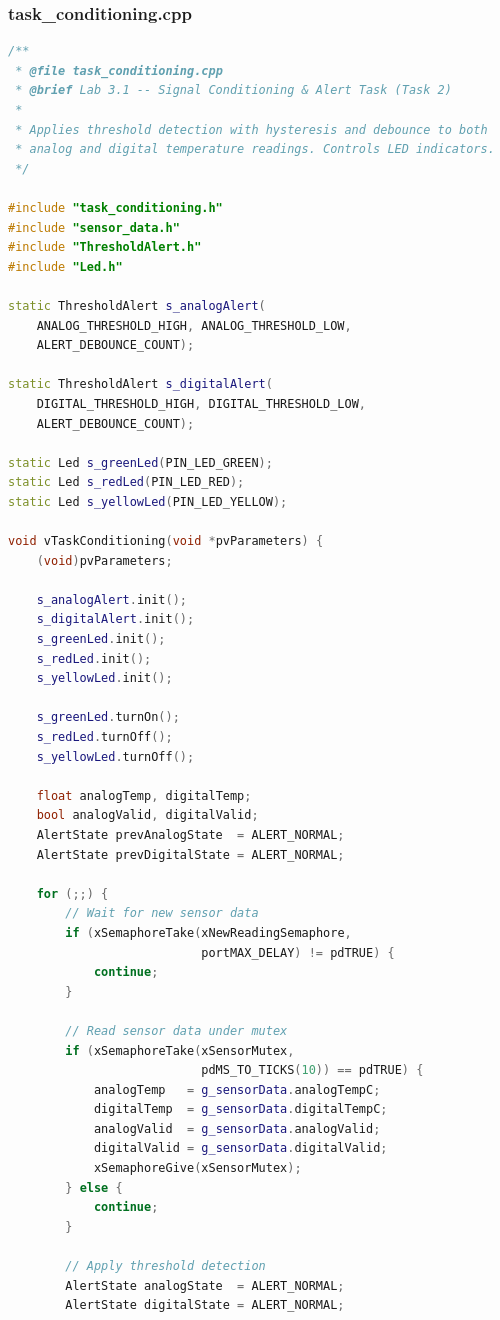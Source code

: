 \subsubsection{task\_conditioning.cpp}
\begin{lstlisting}[language=C++, caption=task\_conditioning.cpp --- Signal Conditioning Task Implementation]
/**
 * @file task_conditioning.cpp
 * @brief Lab 3.1 -- Signal Conditioning & Alert Task (Task 2)
 *
 * Applies threshold detection with hysteresis and debounce to both
 * analog and digital temperature readings. Controls LED indicators.
 */

#include "task_conditioning.h"
#include "sensor_data.h"
#include "ThresholdAlert.h"
#include "Led.h"

static ThresholdAlert s_analogAlert(
    ANALOG_THRESHOLD_HIGH, ANALOG_THRESHOLD_LOW,
    ALERT_DEBOUNCE_COUNT);

static ThresholdAlert s_digitalAlert(
    DIGITAL_THRESHOLD_HIGH, DIGITAL_THRESHOLD_LOW,
    ALERT_DEBOUNCE_COUNT);

static Led s_greenLed(PIN_LED_GREEN);
static Led s_redLed(PIN_LED_RED);
static Led s_yellowLed(PIN_LED_YELLOW);

void vTaskConditioning(void *pvParameters) {
    (void)pvParameters;

    s_analogAlert.init();
    s_digitalAlert.init();
    s_greenLed.init();
    s_redLed.init();
    s_yellowLed.init();

    s_greenLed.turnOn();
    s_redLed.turnOff();
    s_yellowLed.turnOff();

    float analogTemp, digitalTemp;
    bool analogValid, digitalValid;
    AlertState prevAnalogState  = ALERT_NORMAL;
    AlertState prevDigitalState = ALERT_NORMAL;

    for (;;) {
        // Wait for new sensor data
        if (xSemaphoreTake(xNewReadingSemaphore,
                           portMAX_DELAY) != pdTRUE) {
            continue;
        }

        // Read sensor data under mutex
        if (xSemaphoreTake(xSensorMutex,
                           pdMS_TO_TICKS(10)) == pdTRUE) {
            analogTemp   = g_sensorData.analogTempC;
            digitalTemp  = g_sensorData.digitalTempC;
            analogValid  = g_sensorData.analogValid;
            digitalValid = g_sensorData.digitalValid;
            xSemaphoreGive(xSensorMutex);
        } else {
            continue;
        }

        // Apply threshold detection
        AlertState analogState  = ALERT_NORMAL;
        AlertState digitalState = ALERT_NORMAL;


\end{lstlisting}

